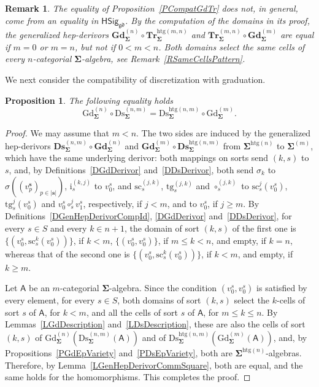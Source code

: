 \documentclass[a4paper, reqno]{amsbook}
\newcommand{\bb}[1]{\ensuremath{\lvert #1 \rvert}}
\newcommand{\sig}[1]{\mathbf{#1}}             %
\newcommand{\calg}[1]{\boldsymbol{\mathsf{#1}}} %
\newcommand{\gd}{\mathfrak{gd}}              %
\newcommand{\htg}{\mathrm{htg}}                %
\newcommand{\src}{\mathrm{sc}}
\newcommand{\tgt}{\mathrm{tg}}
\newcommand{\Gd}{\mathrm{Gd}}
\newcommand{\Ds}{\mathrm{Ds}}
\newcommand{\bGd}{\mathbf{Gd}}
\newcommand{\bDs}{\mathbf{Ds}}
\newcommand{\bTr}{\mathbf{Tr}}
\theoremstyle{plain}
\newtheorem{proposition}[theorem]{Proposition}
\newtheorem{remark}[theorem]{Remark}
\theoremstyle{definition}
\begin{document}
\begin{remark}\label{RCompatGdTrDerivors}
The equality of Proposition~\ref{PCompatGdTr} does not, in general, come from an equality in $\mathsf{HSig}_{\gd}$.
By the computation of the domains in its proof, the generalized hep-derivors $\bGd^{(n)}_{\sig{\Sigma}}\circ\bTr^{\htg(m,n)}_{\sig{\Sigma}}$ and $\bTr^{(m,n)}_{\sig{\Sigma}}\circ\bGd^{(m)}_{\sig{\Sigma}}$ are equal if $m=0$ or $m=n$, but not if $0<m<n$.
Both domains select the same cells of every $n$-categorial $\sig{\Sigma}$-algebra, see Remark~\ref{RSameCellsPattern}.
\end{remark}

We next consider the compatibility of discretization with graduation.

\begin{proposition}\label{PCompatGdDs}
The following equality holds
$$
\Gd^{(n)}_{\sig{\Sigma}}\circ\Ds^{(n,m)}_{\sig{\Sigma}}=\Ds^{\htg(n,m)}_{\sig{\Sigma}}\circ\Gd^{(m)}_{\sig{\Sigma}}.
$$
\end{proposition}
\begin{proof}
We may assume that $m<n$.
The two sides are induced by the generalized hep-derivors $\bDs^{(n,m)}_{\sig{\Sigma}}\circ\bGd^{(n)}_{\sig{\Sigma}}$ and $\bGd^{(m)}_{\sig{\Sigma}}\circ\bDs^{\htg(n,m)}_{\sig{\Sigma}}$ from $\sig{\Sigma}^{\htg(n)}$ to $\sig{\Sigma}^{(m)}$, which have the same underlying derivor: both mappings on sorts send $(k,s)$ to $s$, and, by Definitions~\ref{DGdDerivor} and~\ref{DDsDerivor}, both send $\sigma_{k}$ to $\sigma((v^{\mathbf{s}}_{p})_{p\in\bb{\mathbf{s}}})$, $\mathrm{i}^{(k,j)}_{s}$ to $v^{s}_{0}$, and $\src^{(j,k)}_{s}$, $\tgt^{(j,k)}_{s}$ and $\circ^{(j,k)}_{s}$ to $\src^{j}_{s}(v^{s}_{0})$, $\tgt^{j}_{s}(v^{s}_{0})$ and $v^{s}_{0}\circ^{j}_{s}v^{s}_{1}$, respectively, if $j<m$, and to $v^{s}_{0}$, if $j\geq m$.
By Definitions~\ref{DGenHepDerivorCompId}, \ref{DGdDerivor} and~\ref{DDsDerivor}, for every $s\in S$ and every $k\in n+1$, the domain of sort $(k,s)$ of the first one is $\{(v^s_0,\src^k_s(v^s_0))\}$, if $k<m$, $\{(v^s_0,v^s_0)\}$, if $m\leq k<n$, and empty, if $k=n$, whereas that of the second one is $\{(v^s_0,\src^k_s(v^s_0))\}$, if $k<m$, and empty, if $k\geq m$.

Let $\calg{A}$ be an $m$-categorial $\sig{\Sigma}$-algebra.
Since the condition $(v^s_0,v^s_0)$ is satisfied by every element, for every $s\in S$, both domains of sort $(k,s)$ select the $k$-cells of sort $s$ of $\calg{A}$, for $k<m$, and all the cells of sort $s$ of $\calg{A}$, for $m\leq k\leq n$.
By Lemmas~\ref{LGdDescription} and~\ref{LDsDescription}, these are also the cells of sort $(k,s)$ of $\Gd^{(n)}_{\sig{\Sigma}}(\Ds^{(n,m)}_{\sig{\Sigma}}(\calg{A}))$ and of $\Ds^{\htg(n,m)}_{\sig{\Sigma}}(\Gd^{(m)}_{\sig{\Sigma}}(\calg{A}))$, and, by Propositions~\ref{PGdEpVariety} and~\ref{PDsEpVariety}, both are $\sig{\Sigma}^{\htg(n)}$-algebras.
Therefore, by Lemma~\ref{LGenHepDerivorCommSquare}, both are equal, and the same holds for the homomorphisms. This completes the proof.
\end{proof}
\end{document}
